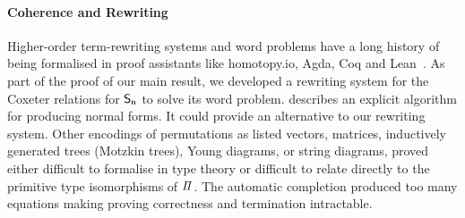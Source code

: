 
\paragraph{Coherence and Rewriting}

Higher-order term-rewriting systems and word problems have a long history of being formalised in proof assistants like
    {homotopy.io}, Agda, Coq and Lean~\cite{krausCoherenceWellFoundednessTaming2020}. As part of the proof of our main
result, we developed a rewriting system for the Coxeter relations for $\Sn$ to solve its word problem. \citet{Hiver-coq}
describes an explicit algorithm for producing normal forms. It could provide an alternative to our rewriting system. Other
encodings of permutations as listed vectors, matrices, inductively generated trees (Motzkin trees), Young diagrams, or
string diagrams, proved either difficult to formalise in type theory or difficult to relate directly to the primitive type
isomorphisms of $\mathit{\Pi}$. The automatic \citet{knuthSimpleWordProblems1970} completion produced too many equations
making proving correctness and termination intractable.

